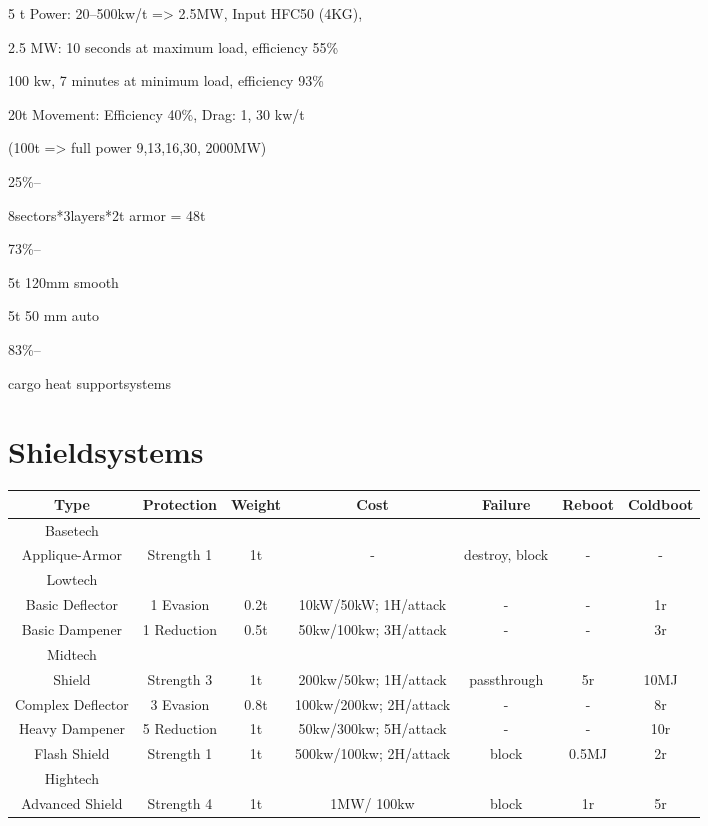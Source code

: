 5 t Power: 20--500kw/t => 2.5MW, Input HFC50 (4KG), \par
2.5 MW: 10 seconds at maximum load, efficiency 55\%\par
100 kw, 7 minutes at minimum load, efficiency 93\%\par
20t Movement: Efficiency 40\%, Drag: 1, 30 kw/t\par
(100t => full power 9,13,16,30, 2000MW)\par
25\%-- \par
8sectors*3layers*2t armor = 48t\par
73\%--\par
5t 120mm smooth\par
5t 50 mm auto\par
83\%--\par
cargo
heat
supportsystems



\section{Shieldsystems}\label{sec:shieldsystems}
\begin{tabular}{c|cccccc}
    Type & Protection &Weight& Cost & Failure  & Reboot & Coldboot \\
    \hline Basetech\\
    Applique-Armor & Strength 1 & 1t & - & destroy, block & - & - \\
    \hline Lowtech\\
    Basic Deflector & 1 Evasion & 0.2t & 10kW/50kW;
    1H/attack & - & - & 1r\\
    Basic Dampener & 1 Reduction & 0.5t & 50kw/100kw;
    3H/attack & - & - & 3r \\
    \hline Midtech\\
    Shield & Strength 3 & 1t & 200kw/50kw;
    1H/attack & passthrough & 5r & 10MJ \\
    Complex Deflector & 3 Evasion & 0.8t & 100kw/200kw;
    2H/attack & - & - & 8r\\
    Heavy Dampener & 5 Reduction & 1t & 50kw/300kw;
    5H/attack & - & - & 10r\\
    Flash Shield & Strength 1 & 1t & 500kw/100kw;
    2H/attack & block & 0.5MJ & 2r\\
    \hline Hightech\\
    Advanced Shield & Strength 4 & 1t & 1MW/ 100kw & block & 1r & 5r \\
\end{tabular}\par


